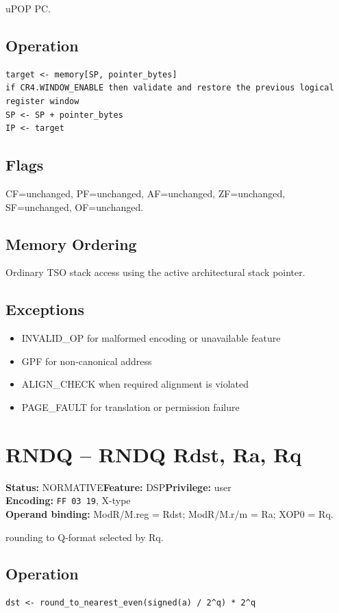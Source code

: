 \documentclass[10pt]{article}
\begin{document}
uPOP PC.

\subsection*{Operation}
\begin{lstlisting}
target <- memory[SP, pointer_bytes]
if CR4.WINDOW_ENABLE then validate and restore the previous logical register window
SP <- SP + pointer_bytes
IP <- target
\end{lstlisting}
\subsection*{Flags}
CF=unchanged, PF=unchanged, AF=unchanged, ZF=unchanged, SF=unchanged, OF=unchanged.
\subsection*{Memory Ordering}
Ordinary TSO stack access using the active architectural stack pointer.
\subsection*{Exceptions}
\begin{itemize}
\item INVALID\_OP for malformed encoding or unavailable feature
\item GPF for non-canonical address
\item ALIGN\_CHECK when required alignment is violated
\item PAGE\_FAULT for translation or permission failure
\end{itemize}
\clearpage

\section{RNDQ -- RNDQ Rdst, Ra, Rq}
\textbf{Status:} NORMATIVE\quad \textbf{Feature:} DSP\quad \textbf{Privilege:} user\\
\textbf{Encoding:} \texttt{FF 03 19}, X-type\\
\textbf{Operand binding:} ModR/M.reg = Rdst; ModR/M.r/m = Ra; XOP0 = Rq.

rounding to Q-format selected by Rq.

\subsection*{Operation}
\begin{lstlisting}
dst <- round_to_nearest_even(signed(a) / 2^q) * 2^q
\end{lstlisting}
\end{document}
